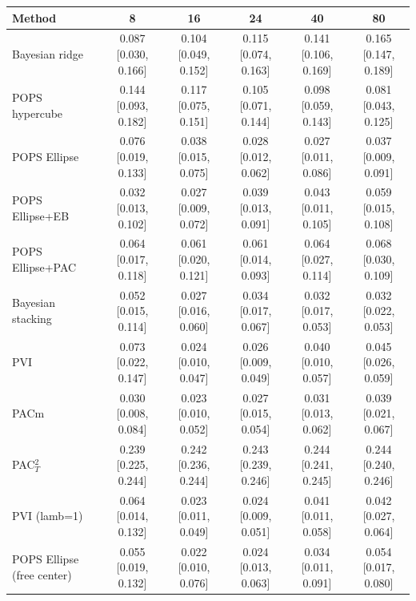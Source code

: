 \begin{tabular}{lccccc}
\toprule
Method & 8 & 16 & 24 & 40 & 80 \\
\midrule
Bayesian ridge & 0.087 {\scriptsize[0.030, 0.166]} & 0.104 {\scriptsize[0.049, 0.152]} & 0.115 {\scriptsize[0.074, 0.163]} & 0.141 {\scriptsize[0.106, 0.169]} & 0.165 {\scriptsize[0.147, 0.189]} \\
POPS hypercube & 0.144 {\scriptsize[0.093, 0.182]} & 0.117 {\scriptsize[0.075, 0.151]} & 0.105 {\scriptsize[0.071, 0.144]} & 0.098 {\scriptsize[0.059, 0.143]} & 0.081 {\scriptsize[0.043, 0.125]} \\
POPS Ellipse & 0.076 {\scriptsize[0.019, 0.133]} & 0.038 {\scriptsize[0.015, 0.075]} & 0.028 {\scriptsize[0.012, 0.062]} & 0.027 {\scriptsize[0.011, 0.086]} & 0.037 {\scriptsize[0.009, 0.091]} \\
POPS Ellipse+EB & 0.032 {\scriptsize[0.013, 0.102]} & 0.027 {\scriptsize[0.009, 0.072]} & 0.039 {\scriptsize[0.013, 0.091]} & 0.043 {\scriptsize[0.011, 0.105]} & 0.059 {\scriptsize[0.015, 0.108]} \\
POPS Ellipse+PAC & 0.064 {\scriptsize[0.017, 0.118]} & 0.061 {\scriptsize[0.020, 0.121]} & 0.061 {\scriptsize[0.014, 0.093]} & 0.064 {\scriptsize[0.027, 0.114]} & 0.068 {\scriptsize[0.030, 0.109]} \\
Bayesian stacking & 0.052 {\scriptsize[0.015, 0.114]} & 0.027 {\scriptsize[0.016, 0.060]} & 0.034 {\scriptsize[0.017, 0.067]} & 0.032 {\scriptsize[0.017, 0.053]} & 0.032 {\scriptsize[0.022, 0.053]} \\
PVI & 0.073 {\scriptsize[0.022, 0.147]} & 0.024 {\scriptsize[0.010, 0.047]} & 0.026 {\scriptsize[0.009, 0.049]} & 0.040 {\scriptsize[0.010, 0.057]} & 0.045 {\scriptsize[0.026, 0.059]} \\
PACm & 0.030 {\scriptsize[0.008, 0.084]} & 0.023 {\scriptsize[0.010, 0.052]} & 0.027 {\scriptsize[0.015, 0.054]} & 0.031 {\scriptsize[0.013, 0.062]} & 0.039 {\scriptsize[0.021, 0.067]} \\
PAC$^2_T$ & 0.239 {\scriptsize[0.225, 0.244]} & 0.242 {\scriptsize[0.236, 0.244]} & 0.243 {\scriptsize[0.239, 0.246]} & 0.244 {\scriptsize[0.241, 0.245]} & 0.244 {\scriptsize[0.240, 0.246]} \\
PVI (lamb=1) & 0.064 {\scriptsize[0.014, 0.132]} & 0.023 {\scriptsize[0.011, 0.049]} & 0.024 {\scriptsize[0.009, 0.051]} & 0.041 {\scriptsize[0.011, 0.058]} & 0.042 {\scriptsize[0.027, 0.064]} \\
POPS Ellipse (free center) & 0.055 {\scriptsize[0.019, 0.132]} & 0.022 {\scriptsize[0.010, 0.076]} & 0.024 {\scriptsize[0.013, 0.063]} & 0.034 {\scriptsize[0.011, 0.091]} & 0.054 {\scriptsize[0.017, 0.080]} \\

\end{tabular}
